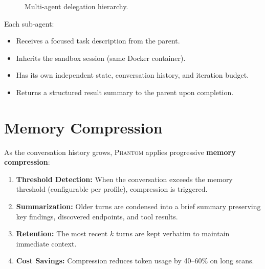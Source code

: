 \documentclass[12pt,a4paper,twoside]{report}
\makeatletter
\newcommand{\phantom@}{\textsc{Phantom}}
\makeatother
\begin{document}
\begin{figure}[H]
\centering
{}
\caption{Multi-agent delegation hierarchy.}
\label{fig:multiagent}
\end{figure}

Each sub-agent:
\begin{itemize}
    \item Receives a focused task description from the parent.
    \item Inherits the sandbox session (same Docker container).
    \item Has its own independent state, conversation history, and iteration budget.
    \item Returns a structured result summary to the parent upon completion.
\end{itemize}

\section{Memory Compression}

As the conversation history grows, \phantom@{} applies progressive \textbf{memory compression}:

\begin{enumerate}
    \item \textbf{Threshold Detection:} When the conversation exceeds the memory threshold (configurable per profile), compression is triggered.
    \item \textbf{Summarization:} Older turns are condensed into a brief summary preserving key findings, discovered endpoints, and tool results.
    \item \textbf{Retention:} The most recent $k$ turns are kept verbatim to maintain immediate context.
    \item \textbf{Cost Savings:} Compression reduces token usage by 40--60\% on long scans.
\end{enumerate}
\end{document}
